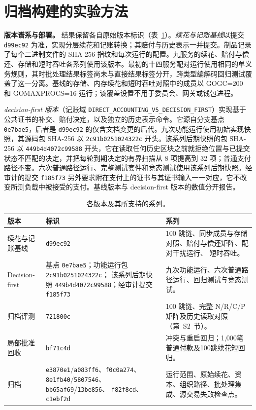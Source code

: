 \section{归档构建的实验方法}
\label{sec:supp-methods}

\noindent\textbf{版本谱系与部署。}
结果保留各自原始版本标识（表~\ref{tab:supp-builds}）。\emph{续花与记账基线}以提交 \texttt{d99ec92} 为准，实现分层续花和记账转换；其赔付与历史表示一并提交。制品记录了每个二进制文件的 SHA-256 指纹和每次运行的配置。九服务的续花、赔付与偿还、存储和短时吞吐各系列使用该版本。最初的十四服务配对运行使用相同的单义务规则，其时批处理结果标签尚未与直接结果标签分开，跨类型编解码回归测试覆盖了这一分离。基线的存储、内存续花和短时吞吐对照中的成员以 GOGC=200 和 GOMAXPROCS=16 运行；该覆盖设置不用于委员会、网关或钱包进程。

\emph{decision-first 版本}（记账域 \texttt{DIRECT\_ACCOUNTING\_V5\_DECISION\_FIRST}）实现基于公共证书的补交、赔付决定，以及独立的历史表示命令。它源自分支基点 \texttt{0e7bae5}，后者是 \texttt{d99ec92} 的仅含文档变更的后代。九次功能运行使用初始实现快照，其源码包 SHA-256 以 \texttt{2c91b0251024322c} 开头。该系列后期快照的包 SHA-256 以 \texttt{449b4d4072c99588} 开头，它在读取任何历史区块之前就拒绝位置与已提交状态不匹配的决定，并把每轮到期决定的有界扫描从 8 项提高到 32 项；普通支付路径不变。六次普通路径运行、完整测试套件和竞态测试使用该系列后期快照。经审计的提交 \texttt{f185f73} 另外要求附在支付上的证书与其证书输入一一对应，它不改变所测负载中被接受的支付。基线版本与 decision-first 版本的数值分开报告。

\begin{table}[t]
  \caption{各版本及其所支持的系列。}
  \label{tab:supp-builds}
  \centering
  \small
  \begin{tabular}{@{}p{}p{}p{}@{}}
    \toprule
    版本 & 标识 & 系列 \\
    \midrule
    续花与记账基线
      & \texttt{d99ec92}
      & 100 跳链、同步成员与存储对照、赔付与偿还矩阵、配对干扰运行、
        短时吞吐。 \\
    Decision-first
      & 基点 \texttt{0e7bae5}；功能运行包 \texttt{2c91b0251024322c}；
        该系列后期快照 \texttt{449b4d4072c99588}；经审计提交 \texttt{f185f73}
      & 九次功能运行、六次普通路径运行、回归测试与竞态测试。 \\
    归档评测
      & \texttt{721800c}
      & 100 跳链、完整 N/R/C/P 矩阵及历史读取对照（第~S2~节）。 \\
    局部批准回收
      & \texttt{bf71c4d}
      & 冲突与重启回归；1,000笔普通付款及100跳续花短回归。 \\
    归档
      & \texttt{e3870e1}/\texttt{a083ff6}、\texttt{f0c0a274}、
        \texttt{8e1fb40}/\texttt{5807546}、\texttt{bb65af69}/\texttt{13be856}、
        \texttt{f82f8cd}、\texttt{c1ebf2d}
      & 运行范围、原始续花、资本、组织路径、批处理集成、源交易失败检查点。 \\
    \bottomrule
  \end{tabular}
\end{table}


